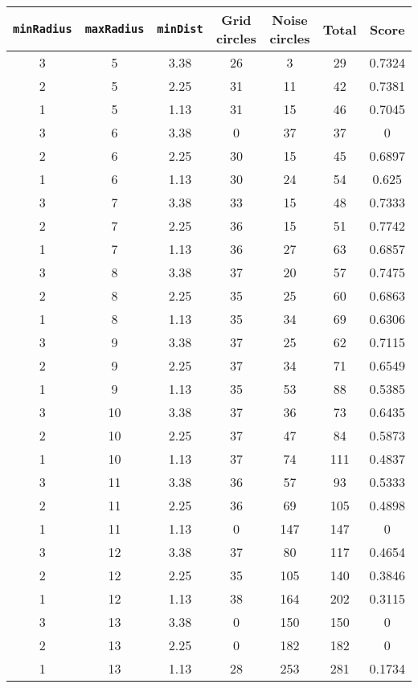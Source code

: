 \documentclass[letterpaper, 12pt]{article}
\begin{document}
\begin{longtable}{|c|c|c|c|c|c|c|}
\hline
\textbf{\texttt{minRadius}} & \textbf{\texttt{maxRadius}} & \textbf{\texttt{minDist}} & \textbf{Grid circles} & \textbf{Noise circles} & \textbf{Total} & \textbf{Score} \\
\hline
3 & 5 & 3.38 & 26 & 3 & 29 & 0.7324 \\
\hline
2 & 5 & 2.25 & 31 & 11 & 42 & 0.7381 \\
\hline
1 & 5 & 1.13 & 31 & 15 & 46 & 0.7045 \\
\hline
3 & 6 & 3.38 & 0 & 37 & 37 & 0 \\
\hline
2 & 6 & 2.25 & 30 & 15 & 45 & 0.6897 \\
\hline
1 & 6 & 1.13 & 30 & 24 & 54 & 0.625 \\
\hline
3 & 7 & 3.38 & 33 & 15 & 48 & 0.7333 \\
\hline
2 & 7 & 2.25 & 36 & 15 & 51 & 0.7742 \\
\hline
1 & 7 & 1.13 & 36 & 27 & 63 & 0.6857 \\
\hline
3 & 8 & 3.38 & 37 & 20 & 57 & 0.7475 \\
\hline
2 & 8 & 2.25 & 35 & 25 & 60 & 0.6863 \\
\hline
1 & 8 & 1.13 & 35 & 34 & 69 & 0.6306 \\
\hline
3 & 9 & 3.38 & 37 & 25 & 62 & 0.7115 \\
\hline
2 & 9 & 2.25 & 37 & 34 & 71 & 0.6549 \\
\hline
1 & 9 & 1.13 & 35 & 53 & 88 & 0.5385 \\
\hline
3 & 10 & 3.38 & 37 & 36 & 73 & 0.6435 \\
\hline
2 & 10 & 2.25 & 37 & 47 & 84 & 0.5873 \\
\hline
1 & 10 & 1.13 & 37 & 74 & 111 & 0.4837 \\
\hline
3 & 11 & 3.38 & 36 & 57 & 93 & 0.5333 \\
\hline
2 & 11 & 2.25 & 36 & 69 & 105 & 0.4898 \\
\hline
1 & 11 & 1.13 & 0 & 147 & 147 & 0 \\
\hline
3 & 12 & 3.38 & 37 & 80 & 117 & 0.4654 \\
\hline
2 & 12 & 2.25 & 35 & 105 & 140 & 0.3846 \\
\hline
1 & 12 & 1.13 & 38 & 164 & 202 & 0.3115 \\
\hline
3 & 13 & 3.38 & 0 & 150 & 150 & 0 \\
\hline
2 & 13 & 2.25 & 0 & 182 & 182 & 0 \\
\hline
1 & 13 & 1.13 & 28 & 253 & 281 & 0.1734 \\

\end{longtable}
\end{document}
